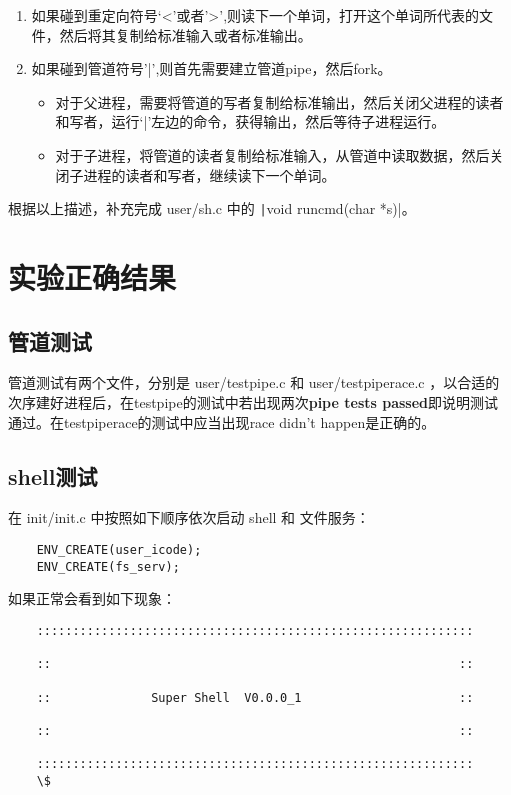\begin{enumerate}
	\item 如果碰到重定向符号‘<’或者’>’,则读下一个单词，打开这个单词所代表的文件，然后将其复制给标准输入或者标准输出。
	\item 如果碰到管道符号’|’,则首先需要建立管道pipe，然后fork。
	\begin{itemize}
		\item 对于父进程，需要将管道的写者复制给标准输出，然后关闭父进程的读者和写者，运行‘|’左边的命令，获得输出，然后等待子进程运行。
		\item 对于子进程，将管道的读者复制给标准输入，从管道中读取数据，然后关闭子进程的读者和写者，继续读下一个单词。
	\end{itemize}
\end{enumerate}

\begin{exercise}
	根据以上描述，补充完成 user/sh.c 中的 \texttt|void runcmd(char *s)|。
\end{exercise}

\section{实验正确结果}

\subsection{管道测试}
管道测试有两个文件，分别是 user/testpipe.c 和 user/testpiperace.c ，以合适的次序建好进程后，在testpipe的测试中若出现两次\textbf{pipe tests passed}即说明测试通过。在testpiperace的测试中应当出现{race didn't happen}是正确的。

\subsection{shell测试}
在 init/init.c 中按照如下顺序依次启动 shell 和 文件服务：

\begin{verbatim}
	ENV_CREATE(user_icode);
	ENV_CREATE(fs_serv);
\end{verbatim}

如果正常会看到如下现象：

\begin{verbatim}
	:::::::::::::::::::::::::::::::::::::::::::::::::::::::::::::
	
	::                                                         ::
	
	::              Super Shell  V0.0.0_1                      ::
	
	::                                                         ::
	
	:::::::::::::::::::::::::::::::::::::::::::::::::::::::::::::
	\$
\end{verbatim}

